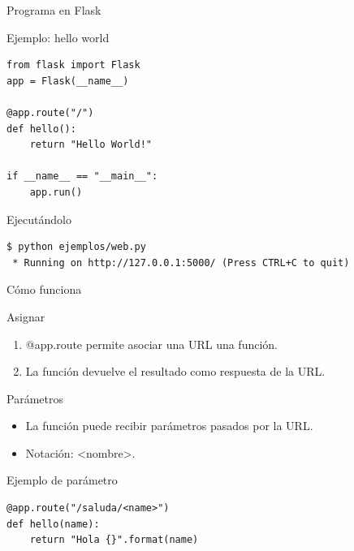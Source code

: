 \documentclass[bigger,unknownkeysallowed]{beamer}
\begin{document}
\begin{frame}[fragile,label={sec:org88ab399}]{Programa en Flask}
 \begin{exampleblock}{Ejemplo: hello world}
\lstset{language=Python,label= ,caption= ,captionpos=b,numbers=none}
\begin{lstlisting}
from flask import Flask
app = Flask(__name__)

@app.route("/")
def hello():
    return "Hello World!"

if __name__ == "__main__":
    app.run()
\end{lstlisting}
\end{exampleblock}

\begin{block}{Ejecutándolo}
\lstset{language=sh,label= ,caption= ,captionpos=b,numbers=none}
\begin{lstlisting}
$ python ejemplos/web.py
 * Running on http://127.0.0.1:5000/ (Press CTRL+C to quit)
\end{lstlisting}
\end{block}
\end{frame}

\begin{frame}[fragile,label={sec:orgfd76996}]{Cómo funciona}
 \begin{block}{Asignar}
\begin{enumerate}
\item \alert{@app.route} permite asociar una URL una función.
\item La función devuelve el resultado como respuesta de la URL.
\end{enumerate}
\end{block}

\begin{block}{Parámetros}
\begin{itemize}
\item La función puede recibir parámetros pasados por la URL.

\item Notación: <nombre>.
\end{itemize}
\end{block}

\begin{exampleblock}{Ejemplo de parámetro}
\lstset{language=Python,label= ,caption= ,captionpos=b,numbers=none}
\begin{lstlisting}
@app.route("/saluda/<name>")
def hello(name):
    return "Hola {}".format(name)
\end{lstlisting}
\end{exampleblock}
\end{frame}
\end{document}
